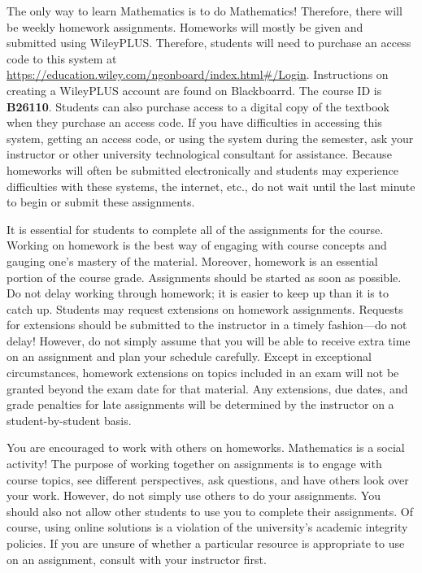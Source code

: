 \documentclass[11pt,letterpaper]{article}
\begin{document}

The only way to learn Mathematics is to do Mathematics! Therefore, there will be weekly homework assignments. Homeworks will mostly be given and submitted using WileyPLUS. Therefore, students will need to purchase an access code to this system at \url{https://education.wiley.com/ngonboard/index.html\#/Login}. Instructions on creating a WileyPLUS account are found on Blackboarrd. The course ID is \textbf{B26110}. Students can also purchase access to a digital copy of the textbook when they purchase an access code. If you have difficulties in accessing this system, getting an access code, or using the system during the semester, ask your instructor or other university technological consultant for assistance. Because homeworks will often be submitted electronically and students may experience difficulties with these systems, the internet, etc., do not wait until the last minute to begin or submit these assignments. \pspace

It is essential for students to complete all of the assignments for the course. Working on homework is the best way of engaging with course concepts and gauging one's mastery of the material. Moreover, homework is an essential portion of the course grade. Assignments should be started as soon as possible. Do not delay working through homework; it is easier to keep up than it is to catch up. Students may request extensions on homework assignments. Requests for extensions should be submitted to the instructor in a timely fashion---do not delay! However, do not simply assume that you will be able to receive extra time on an assignment and plan your schedule carefully. Except in exceptional circumstances, homework extensions on topics included in an exam will not be granted beyond the exam date for that material. Any extensions, due dates, and grade penalties for late assignments will be determined by the instructor on a student-by-student basis. \pspace

You are encouraged to work with others on homeworks. Mathematics is a social activity! The purpose of working together on assignments is to engage with course topics, see different perspectives, ask questions, and have others look over your work. However, do not simply use others to do your assignments. You should also not allow other students to use you to complete their assignments. Of course, using online solutions is a violation of the university's academic integrity policies. If you are unsure of whether a particular resource is appropriate to use on an assignment, consult with your instructor first. \pspace
\end{document}

